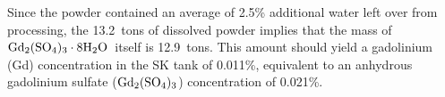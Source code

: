 \documentclass[preprint,12pt]{elsarticle}
\newcommand{\GdSOw}{$\rm Gd_2(\rm SO_4)_3\cdot \rm 8H_2O$\ }
\begin{document}

Since the powder contained an average of 2.5\% additional water left over from processing, the 13.2~tons of dissolved powder implies that the mass of \GdSOw itself is 12.9~tons.
This amount should yield a gadolinium (Gd) concentration in the SK tank of 0.011\%, equivalent to an anhydrous gadolinium sulfate ($\rm Gd_2(\rm SO_4)_3$) concentration of 0.021\%. 


\end{document}
